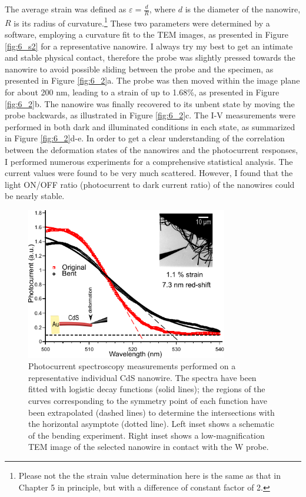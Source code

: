 The average strain was defined as $\varepsilon = \frac{d}{R}$, where $d$ is the diameter of the nanowire, $R$ is its radius of  curvature.\footnote{Please not the the strain value determination here is the same as that in Chapter 5 in principle, but with a difference of constant factor of 2.} 
These two parameters were determined by a software, employing a curvature fit to the TEM images, as presented in Figure \ref{fig:6_s2} for a representative nanowire. 
I always try my best to get an intimate and stable physical contact, therefore the probe was slightly pressed towards the nanowire to avoid possible sliding between the probe and the specimen, as presented in Figure \ref{fig:6_2}a. 
The probe was then moved within the image plane for about 200 nm, leading to a strain of up to 1.68\%, as presented in Figure \ref{fig:6_2}b. 
The nanowire was finally recovered to its unbent state by moving the probe backwards, as illustrated in Figure \ref{fig:6_2}c. 
The I-V measurements were performed in both dark and illuminated conditions in each state, as summarized in Figure \ref{fig:6_2}d-e. 
In order to get a clear understanding of the correlation between the deformation states of the nanowires and the photocurrent responses, I performed numerous experiments for a comprehensive statistical analysis. 
The current values were found to be very much scattered. 
However, I found that the light ON/OFF ratio (photocurrent to dark current ratio) of the nanowires could be nearly stable. 

\begin{figure}[t]  
\centering
\includegraphics[width=250pt]{figures/figure6_4}
\caption[Photocurrent spectroscopy of deformed CdS NW]
{Photocurrent spectroscopy measurements performed on a representative individual CdS nanowire. The spectra have been fitted with logistic decay functions (solid lines); the regions of the curves corresponding to the symmetry point of each function have been extrapolated (dashed lines) to determine the intersections with the horizontal asymptote (dotted line). 
Left inset shows a schematic of the bending experiment. Right inset shows a low-magnification TEM image of the selected nanowire in contact with the W probe. 
\label{fig:6_4}}
\end{figure}

